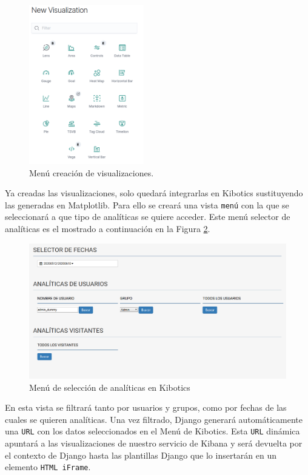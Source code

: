 \documentclass[a4paper, 12pt]{book}
\begin{document}
		\begin{figure}[H]
			\centering
			\includegraphics[width=5cm, keepaspectratio]{img/visualization_selector.png}
			\caption{Menú creación de visualizaciones.}
			\label{fig:visualization_selector}
		\end{figure}
		

		Ya creadas las visualizaciones, solo quedará integrarlas en Kibotics sustituyendo las generadas en Matplotlib. Para ello se creará una vista \texttt{menú} con la que se seleccionará a que tipo de analíticas se quiere acceder. Este menú selector de analíticas es el mostrado a continuación en la Figura \ref{fig:kibotics_analytics_menu}.
	
		\begin{figure}[H]
			\centering
			\includegraphics[width=14cm, keepaspectratio]{img/kibotics_analytics_menu.png}
			\caption{Menú de selección de analíticas en Kibotics}
			\label{fig:kibotics_analytics_menu}
		\end{figure}
		
		En esta vista se filtrará tanto por usuarios y grupos, como por fechas de las cuales se quieren analíticas. Una vez filtrado, Django generará automáticamente una \texttt{URL} con los datos seleccionados en el Menú de Kibotics. Esta \texttt{URL} dinámica apuntará a las visualizaciones de nuestro servicio de Kibana y será devuelta por el contexto de Django hasta las plantillas Django que lo insertarán en un elemento \texttt{HTML iFrame}.
	
\end{document}
